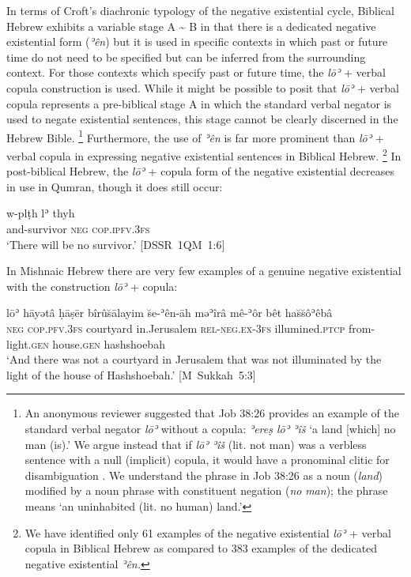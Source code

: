 ﻿\documentclass[output=paper]{langsci/langscibook}
\begin{document}
In terms of Croft's diachronic typology of the negative existential cycle,
Biblical Hebrew exhibits a variable stage A {\textasciitilde} B in that
there is a dedicated negative existential form (\textit{ʾên}) but it is
used in specific contexts in which past or future time do not need to be
specified but can be inferred from the surrounding context. For those
contexts which specify past or future time, the \textit{lōʾ} + verbal
copula construction is used. While it might be possible to posit that
\textit{lōʾ} + verbal copula represents a pre-biblical stage A in which the
standard verbal negator is used to negate existential sentences, this stage
cannot be clearly discerned in the Hebrew Bible.%
%
    \footnote{An anonymous reviewer suggested that Job 38:26 provides an
    example of the standard verbal negator \textit{lōʾ} without a copula:
    \textit{ʾereṣ lōʾ ʾîš} `a land [which] no man (is).' We argue instead
    that if \textit{lōʾ ʾîš} (lit. not man) was a verbless sentence with a
    null (implicit) copula, it would have a pronominal clitic for
    disambiguation  \parencite[see][]{Naude1996}.  We understand the phrase
    in Job 38:26 as a noun (\textit{land}) modified by a noun phrase with
    constituent negation (\textit{no} \textit{man}); the phrase means `an
    uninhabited (lit.  no human) land.'} %
%
Furthermore, the use of \textit{ʾên} is far more
prominent than \textit{lōʾ}  + verbal copula in expressing negative
existential sentences in Biblical Hebrew.%
%
    \footnote{We have identified only
    61 examples of the negative existential \textit{lōʾ} + verbal copula in
    Biblical Hebrew as compared to 383 examples of the dedicated negative
    existential \textit{ʾên.}} %
%
In post-biblical Hebrew, the \textit{lōʾ}  +
copula form of the negative existential decreases in use in Qumran, though
it does still occur:
%
\begin{exe}\ex \label{ex:heb-survivor}
    \gll w-plṭh lʾ thyh \\
and-survivor    \textsc{neg}    \textsc{cop.ipfv.3fs}  \\
    \glt
  `There will be no survivor.' \mbox{[DSSR 1QM 1:6]}
    \end{exe} 
%
In Mishnaic Hebrew there are very few examples of a genuine negative existential with the construction \textit{lōʾ}  + copula:
%
\begin{exe}\ex \label{ex:heb-Hashshoebah}
    \gll lōʾ hāyətâ ḥāṣēr bîrû\u{s}ālayim \u{s}e-ʾên-āh məʾîrâ mê-ʾôr  bêt ha\u{s}\u{s}ôʾêbâ\\
 \textsc{neg} \textsc{cop.pfv.3fs} courtyard in.Jerusalem  \textsc{rel}-\textsc{neg.ex}-\textsc{3fs}   illumined.\textsc{ptcp}   from-light.\textsc{gen} house.\textsc{gen}  hashshoebah \\
\glt `And there was not a courtyard in Jerusalem that was not illuminated
by the light of the house of Hashshoebah.' 
\mbox{[M Sukkah 5:3]}
    \end{exe}
\end{document}
